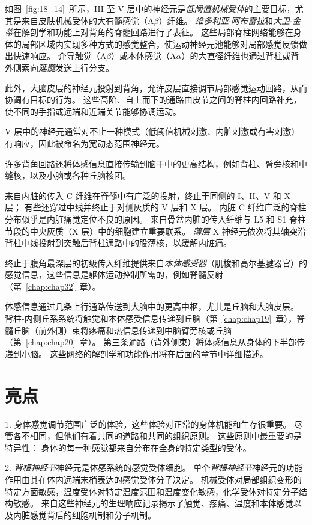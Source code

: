 如图~\ref{fig:18_14}~所示，III 至 V 层中的神经元是\textit{低阈值机械受体}的主要目标，尤其是来自皮肤机械受体的大有髓感觉（A$\beta$）纤维。
\textit{维多利亚$\cdot$阿布雷拉}和\textit{大卫$\cdot$金蒂}在解剖学和功能上对背角的脊髓回路进行了表征\cite{abraira2013sensory}。
这些局部脊柱网络能够在身体的局部区域内实现多种方式的感觉整合，使运动神经元池能够对局部感觉反馈做出快速响应。
介导触觉（A$\beta$）或本体感觉（A$\alpha$）的大直径纤维也通过背柱或背外侧索向\textit{延髓}发送上行分支。


此外，大脑皮层的神经元投射到背角，允许皮层直接调节局部感觉运动回路，从而协调有目标的行为。
这些高阶、自上而下的通路由皮节之间的脊柱内回路补充，使不同的手指或远端和近端关节能够协调运动。


V 层中的神经元通常对不止一种模式（低阈值机械刺激、内脏刺激或有害刺激）有响应，因此被命名为宽动态范围神经元。


许多背角回路还将体感信息直接传输到脑干中的更高结构，例如背柱、臂旁核和中缝核，以及小脑或各种丘脑核团。


来自内脏的传入 C 纤维在脊髓中有广泛的投射，终止于同侧的 I、II、V 和 X 层；
有些还穿过中线并终止于对侧灰质的 V 层和 X 层。
内脏 C 纤维广泛的脊柱分布似乎是内脏痛觉定位不良的原因。 
来自骨盆内脏的传入纤维与 L5 和 S1 脊柱节段的中央灰质（X 层）中的细胞建立重要联系。 
\textit{薄层} X 神经元依次将其轴突沿背柱中线投射到突触后背柱通路中的股薄核，以缓解内脏痛。


终止于腹角最深层的初级传入纤维提供来自\textit{本体感受器}（肌梭和高尔基腱器官）的感觉信息，这些信息是躯体运动控制所需的，例如脊髓反射（第~\ref{chap:chap32}~章）。


体感信息通过几条上行通路传送到大脑中的更高中枢，尤其是丘脑和大脑皮层。
背柱-内侧丘系系统将触觉和本体感受信息传递到丘脑（第~\ref{chap:chap19}~章），脊髓丘脑（前外侧）束将疼痛和热信息传递到中脑臂旁核或丘脑（第~\ref{chap:chap20}~章）。
第三条通路（背外侧束）将体感信息从身体的下半部传递到小脑。
这些网络的解剖学和功能作用将在后面的章节中详细描述。




\section{亮点}


1. 身体感觉调节范围广泛的体验，这些体验对正常的身体机能和生存很重要。
尽管各不相同，但他们有着共同的道路和共同的组织原则。
这些原则中最重要的是特异性：
身体的每一种感觉都来自分布在全身的特定类型的受体。 


2. \textit{背根神经节}神经元是体感系统的感觉受体细胞。
单个\textit{背根神经节}神经元的功能作用由其在体内远端末梢表达的感觉受体分子决定。
机械受体对局部组织变形的特定方面敏感，温度受体对特定温度范围和温度变化敏感，化学受体对特定分子结构敏感。
来自这些神经元的生理响应记录揭示了触觉、疼痛、温度和本体感觉以及内脏感觉背后的细胞机制和分子机制。


